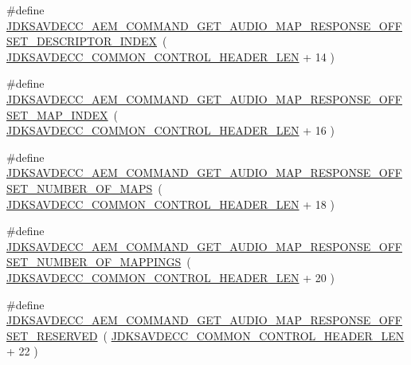 \begin{DoxyCompactItemize}
\item 
\#define \hyperlink{group__command__get__audio__map__response_ga11ceb95b6bc9a0b4ee434cd285a327a0}{J\+D\+K\+S\+A\+V\+D\+E\+C\+C\+\_\+\+A\+E\+M\+\_\+\+C\+O\+M\+M\+A\+N\+D\+\_\+\+G\+E\+T\+\_\+\+A\+U\+D\+I\+O\+\_\+\+M\+A\+P\+\_\+\+R\+E\+S\+P\+O\+N\+S\+E\+\_\+\+O\+F\+F\+S\+E\+T\+\_\+\+D\+E\+S\+C\+R\+I\+P\+T\+O\+R\+\_\+\+I\+N\+D\+EX}~( \hyperlink{group__jdksavdecc__avtp__common__control__header_gaae84052886fb1bb42f3bc5f85b741dff}{J\+D\+K\+S\+A\+V\+D\+E\+C\+C\+\_\+\+C\+O\+M\+M\+O\+N\+\_\+\+C\+O\+N\+T\+R\+O\+L\+\_\+\+H\+E\+A\+D\+E\+R\+\_\+\+L\+EN} + 14 )
\item 
\#define \hyperlink{group__command__get__audio__map__response_gafbb561484cca140e2ccbc8c35e44c731}{J\+D\+K\+S\+A\+V\+D\+E\+C\+C\+\_\+\+A\+E\+M\+\_\+\+C\+O\+M\+M\+A\+N\+D\+\_\+\+G\+E\+T\+\_\+\+A\+U\+D\+I\+O\+\_\+\+M\+A\+P\+\_\+\+R\+E\+S\+P\+O\+N\+S\+E\+\_\+\+O\+F\+F\+S\+E\+T\+\_\+\+M\+A\+P\+\_\+\+I\+N\+D\+EX}~( \hyperlink{group__jdksavdecc__avtp__common__control__header_gaae84052886fb1bb42f3bc5f85b741dff}{J\+D\+K\+S\+A\+V\+D\+E\+C\+C\+\_\+\+C\+O\+M\+M\+O\+N\+\_\+\+C\+O\+N\+T\+R\+O\+L\+\_\+\+H\+E\+A\+D\+E\+R\+\_\+\+L\+EN} + 16 )
\item 
\#define \hyperlink{group__command__get__audio__map__response_gacb905b02710995d208ceb2b1ea9441f9}{J\+D\+K\+S\+A\+V\+D\+E\+C\+C\+\_\+\+A\+E\+M\+\_\+\+C\+O\+M\+M\+A\+N\+D\+\_\+\+G\+E\+T\+\_\+\+A\+U\+D\+I\+O\+\_\+\+M\+A\+P\+\_\+\+R\+E\+S\+P\+O\+N\+S\+E\+\_\+\+O\+F\+F\+S\+E\+T\+\_\+\+N\+U\+M\+B\+E\+R\+\_\+\+O\+F\+\_\+\+M\+A\+PS}~( \hyperlink{group__jdksavdecc__avtp__common__control__header_gaae84052886fb1bb42f3bc5f85b741dff}{J\+D\+K\+S\+A\+V\+D\+E\+C\+C\+\_\+\+C\+O\+M\+M\+O\+N\+\_\+\+C\+O\+N\+T\+R\+O\+L\+\_\+\+H\+E\+A\+D\+E\+R\+\_\+\+L\+EN} + 18 )
\item 
\#define \hyperlink{group__command__get__audio__map__response_ga9480ee4cf5c77b35226420cb66088a3b}{J\+D\+K\+S\+A\+V\+D\+E\+C\+C\+\_\+\+A\+E\+M\+\_\+\+C\+O\+M\+M\+A\+N\+D\+\_\+\+G\+E\+T\+\_\+\+A\+U\+D\+I\+O\+\_\+\+M\+A\+P\+\_\+\+R\+E\+S\+P\+O\+N\+S\+E\+\_\+\+O\+F\+F\+S\+E\+T\+\_\+\+N\+U\+M\+B\+E\+R\+\_\+\+O\+F\+\_\+\+M\+A\+P\+P\+I\+N\+GS}~( \hyperlink{group__jdksavdecc__avtp__common__control__header_gaae84052886fb1bb42f3bc5f85b741dff}{J\+D\+K\+S\+A\+V\+D\+E\+C\+C\+\_\+\+C\+O\+M\+M\+O\+N\+\_\+\+C\+O\+N\+T\+R\+O\+L\+\_\+\+H\+E\+A\+D\+E\+R\+\_\+\+L\+EN} + 20 )
\item 
\#define \hyperlink{group__command__get__audio__map__response_gae639e5a3052946a8e1c20adfe3258e70}{J\+D\+K\+S\+A\+V\+D\+E\+C\+C\+\_\+\+A\+E\+M\+\_\+\+C\+O\+M\+M\+A\+N\+D\+\_\+\+G\+E\+T\+\_\+\+A\+U\+D\+I\+O\+\_\+\+M\+A\+P\+\_\+\+R\+E\+S\+P\+O\+N\+S\+E\+\_\+\+O\+F\+F\+S\+E\+T\+\_\+\+R\+E\+S\+E\+R\+V\+ED}~( \hyperlink{group__jdksavdecc__avtp__common__control__header_gaae84052886fb1bb42f3bc5f85b741dff}{J\+D\+K\+S\+A\+V\+D\+E\+C\+C\+\_\+\+C\+O\+M\+M\+O\+N\+\_\+\+C\+O\+N\+T\+R\+O\+L\+\_\+\+H\+E\+A\+D\+E\+R\+\_\+\+L\+EN} + 22 )

\end{DoxyCompactItemize}

